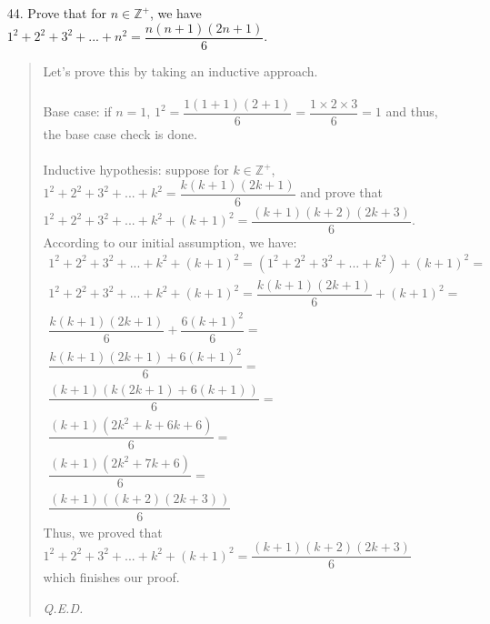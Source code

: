 \documentclass[12pt, a4paper]{article}                      %
\newcommand{\intzp}{\mathbb{Z^+}}
\begin{document}
\begin{itemize}
\item[44.]
Prove that for $n \in \intzp$, we have $1^2 + 2^2 + 3^2 + ... + n^2 = \dfrac{n(n + 1)(2n + 1)}{6}$.
\begin{quote}
Let's prove this by taking an inductive approach.\\\\
Base case: if $n = 1$, $1^2 = \dfrac{1(1 + 1)(2 + 1)}{6} = \dfrac{1 \times 2 \times 3}{6} = 1$ and thus, the base case check is done.\\\\
Inductive hypothesis: suppose for $k \in \intzp$, $1^2 + 2^2 + 3^2 + ... + k^2 = \dfrac{k(k + 1)(2k + 1)}{6}$ and prove that $1^2 + 2^2 + 3^2 + ... + k^2 + (k + 1)^2 = \dfrac{(k + 1)(k + 2)(2k + 3)}{6}$.
According to our initial assumption, we have:\\
\begin{align*}
1^2 + 2^2 + 3^2 + ... + k^2 + (k + 1)^2 = (1^2 + 2^2 + 3^2 + ... + k^2) + (k + 1)^2 =\\
1^2 + 2^2 + 3^2 + ... + k^2 + (k + 1)^2 = \dfrac{k(k + 1)(2k + 1)}{6} + (k + 1)^2 =\\
\dfrac{k(k + 1)(2k + 1)}{6} + \dfrac{6(k + 1)^2}{6} =\\
\dfrac{k(k + 1)(2k + 1) + 6(k + 1)^2}{6} =\\
\dfrac{(k + 1)(k(2k + 1) + 6(k + 1))}{6} =\\
\dfrac{(k + 1)(2k^2 + k + 6k + 6)}{6} =\\
\dfrac{(k + 1)(2k^2 + 7k + 6)}{6} =\\
\dfrac{(k + 1)((k + 2)(2k + 3))}{6}
\end{align*}
Thus, we proved that $1^2 + 2^2 + 3^2 + ... + k^2 + (k + 1)^2 = \dfrac{(k + 1)(k + 2)(2k + 3)}{6}$ which finishes
our proof.
\begin{flushright}
\textit{Q.E.D.}
\end{flushright}
\end{quote}

\item[]
\item[]


\end{itemize}
\end{document}
